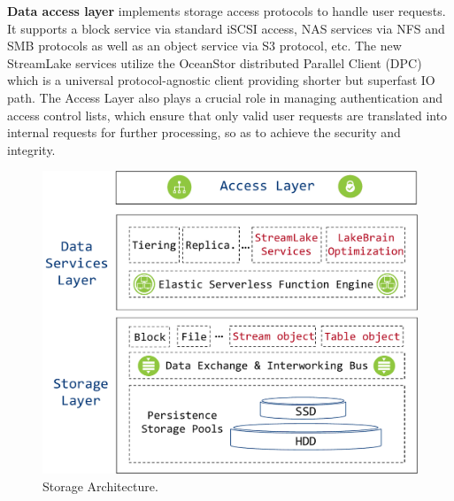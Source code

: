 


\noindent \textbf{Data access layer} implements storage access protocols to handle user requests. It supports a block service via standard iSCSI access, NAS services via NFS and SMB protocols as well as an object service via S3 protocol, etc.
The new StreamLake services utilize the OceanStor distributed Parallel Client (DPC) which is a universal protocol-agnostic client providing shorter but superfast IO path. 
The Access Layer also plays a crucial role in managing authentication and access control lists, which ensure that only valid user requests are translated into internal requests for further processing, so as to achieve  the security and integrity.
 
 
 
 \begin{figure}[!t]
 	\centering
 	\includegraphics[scale=0.35]{figures/archi}
 	\vspace{-1em}
 	\caption{\sys Storage Architecture.}
 	\label{fig:archi}
 	\vspace{-2em}
 \end{figure}
 
 
 